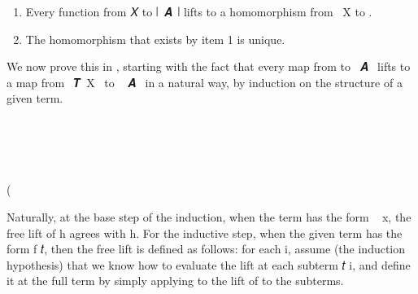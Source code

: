 \begin{enumerate}
\item Every function from \ab 𝑋 to ∣~\ab 𝑨~\af ∣ lifts to a homomorphism from ~\ab X to .
\item The homomorphism that exists by item 1 is unique.
\end{enumerate}

We now prove this in \agda, starting with the fact that every map from  to
~\ab 𝑨~ lifts to a map from ~\af 𝑻~\ab X~ to ~\ab
𝑨~ in a natural way, by induction on the structure of a given term. 
\ccpad
\begin{code}%
\>[1]\AgdaSpace{}%
\AgdaSymbol{:}\AgdaSpace{}%
\AgdaSymbol{(}\AgdaSpace{}%
\AgdaSymbol{:}\AgdaSpace{}%
\AgdaSpace{}%
\AgdaSpace{}%
\AgdaSymbol{)(}\AgdaSpace{}%
\AgdaSymbol{:}\AgdaSpace{}%
\AgdaSpace{}%
\AgdaSpace{}%
\AgdaSpace{}%
\AgdaSpace{}%
\AgdaSymbol{)}\AgdaSpace{}%
\AgdaSpace{}%
\AgdaSpace{}%
\AgdaSpace{}%
\AgdaSpace{}%
\AgdaSpace{}%
\AgdaSpace{}%
\AgdaSpace{}%
\AgdaSpace{}%
\<%
\\
%
\\[\AgdaEmptyExtraSkip]%
%
\>[1]\AgdaSpace{}%
\AgdaSymbol{\AgdaUnderscore{}}\AgdaSpace{}%
\AgdaSpace{}%
\AgdaSymbol{(}\AgdaSpace{}%
\AgdaSymbol{)}\AgdaSpace{}%
\AgdaSymbol{=}\AgdaSpace{}%
\AgdaSpace{}%
\<%
\\
%
\\[\AgdaEmptyExtraSkip]%
%
\>[1]\AgdaSpace{}%
\AgdaSpace{}%
\AgdaSpace{}%
\AgdaSymbol{(}\AgdaSpace{}%
\AgdaSpace{}%
\AgdaSymbol{)}\AgdaSpace{}%
\AgdaSymbol{=}\AgdaSpace{}%
\AgdaSymbol{(}\AgdaSpace{}%
\AgdaSpace{}%
\AgdaSymbol{)}\AgdaSpace{}%
(\AgdaSpace{}%
\AgdaSpace{}%
\AgdaSpace{}%
\AgdaSpace{}%
\AgdaSpace{}%
\AgdaSpace{}%
\AgdaSymbol{(}\AgdaSpace{}%
\AgdaSymbol{))}\<%
\end{code}
\ccpad
Naturally, at the base step of the induction, when the term has the form ~\ab
x, the free lift of \ab h agrees with \ab h.  For the inductive step, when the given term has the form 
\ab f \ab 𝑡, then the free lift is defined as follows: for each \ab i,
assume (the induction hypothesis) that we know how to evaluate the lift at each subterm \ab 𝑡 \ab i, and
define it at the full term by simply applying 
\AgdaSymbol{(}\AgdaSpace{}%
\AgdaSpace{}%
\AgdaSymbol{)}\AgdaSpace{}%
to the lift of to the subterms.


